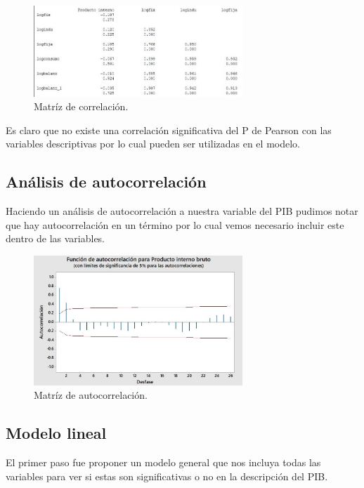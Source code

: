 \documentclass[a4paper]{article}
\begin{document}
\begin{figure}[h]
\centering
\includegraphics[width=0.7\textwidth]{6.jpg}
\caption{\label{fig:tesla}Matríz de correlación.}
\end{figure}

Es claro que no existe una correlación significativa del P de Pearson con las variables descriptivas por lo cual pueden ser utilizadas en el modelo.

\subsection{Análisis de autocorrelación}

Haciendo un análisis de autocorrelación a nuestra variable del PIB pudimos notar que hay autocorrelación en un término por lo cual vemos necesario incluir este dentro de las variables.

\begin{figure}[h]
\centering
\includegraphics[width=0.7\textwidth]{7.jpg}
\caption{\label{fig:tesla}Matríz de autocorrelación.}
\end{figure}

\subsection{Modelo lineal}

El primer paso fue proponer un modelo general que nos incluya todas las variables para ver si estas son significativas o no en la descripción del PIB.\\
\end{document}
